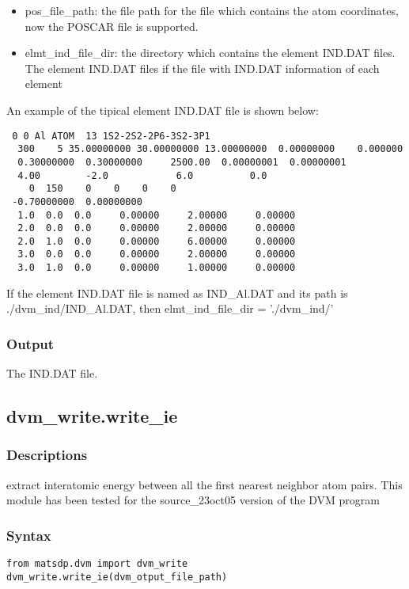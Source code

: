 \documentclass[12pt]{book}
\begin{document}
\begin{itemize}
\item pos\_file\_path: the file path for the file which contains the atom coordinates, now the POSCAR file is supported.
\item elmt\_ind\_file\_dir: the directory which contains the element IND.DAT files. The element IND.DAT files if the file with IND.DAT information of each element
\end{itemize}


An example of the tipical element IND.DAT file is shown below:

\begin{lstlisting}
 0 0 Al ATOM  13 1S2-2S2-2P6-3S2-3P1
  300    5 35.00000000 30.00000000 13.00000000  0.00000000    0.000000
  0.30000000  0.30000000     2500.00  0.00000001  0.00000001
  4.00        -2.0            6.0          0.0
    0  150    0    0    0    0
 -0.70000000  0.00000000
  1.0  0.0  0.0     0.00000     2.00000     0.00000
  2.0  0.0  0.0     0.00000     2.00000     0.00000
  2.0  1.0  0.0     0.00000     6.00000     0.00000
  3.0  0.0  0.0     0.00000     2.00000     0.00000
  3.0  1.0  0.0     0.00000     1.00000     0.00000
\end{lstlisting}

If the element IND.DAT file is named as IND\_Al.DAT and its path is ./dvm\_ind/IND\_Al.DAT, then elmt\_ind\_file\_dir = './dvm\_ind/'

\subsubsection{Output}

The IND.DAT file.


\subsection{dvm\_write.write\_ie}
\subsubsection{Descriptions}
extract interatomic energy between all the first nearest neighbor atom pairs. This module has been tested for the source\_23oct05 version of the DVM program

\subsubsection{Syntax}
\begin{lstlisting}
from matsdp.dvm import dvm_write
dvm_write.write_ie(dvm_otput_file_path)
\end{lstlisting}
\end{document}

